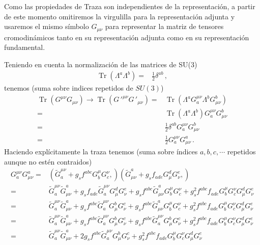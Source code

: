 Como las propiedades de Traza  son independientes de la representación, a partir de este momento omitiremos la virgulilla para la representación adjunta y usaremos el mismo símbolo $G_{\mu\nu}$ para representar la matriz de tensores cromodinámicos tanto en su representación adjunta como en su representación fundamental. 
\begin{frame}
Teniendo en cuenta la normalización de las matrices de SU(3)
\begin{align}
   \operatorname{Tr}\left(\Lambda^a\Lambda^b\right)=&\frac{1}{2}\delta^{ab}\,,
\end{align}
tenemos (suma sobre indices repetidos de $SU(3)$)
\begin{align}
  \operatorname{Tr}\left(G^{\mu\nu}G_{\mu\nu}\right)\to
  \operatorname{Tr}\left({G\,'}^{\mu\nu}{G\,'}_{\mu\nu}\right)
  =&\operatorname{Tr}\left(\Lambda^a{G}^{\mu\nu}_a \Lambda^b{G}_{\mu\nu}^b\right)\nonumber\\
  =&\operatorname{Tr}\left(\Lambda^a \Lambda^b\right){G}^{\mu\nu}_a {G}_{\mu\nu}^b\nonumber\\
  =&\frac{1}{2}\delta^{a b}{G}^{\mu\nu}_a {G}_{\mu\nu}^b\nonumber\\
  =&\frac{1}{2}{G}^{\mu\nu}_a {G}_{\mu\nu}^a\,.
\end{align}
Haciendo explícitamente la traza tenemos (suma sobre índices $a,b,c,\cdots$ repetidos aunque no estén contraidos)
\begin{align}
  {G}^{\mu\nu}_a {G}_{\mu\nu}^a=&
\left( \widetilde{G}^{\mu\nu}_a+g_s f^{abc}G^\mu_b G^\nu_c, \right)
\left( \widetilde{G}_{\mu\nu}^a+g_s f_{ade}G_\mu^d G_\nu^e, \right) \nonumber\\
=&\widetilde{G}^{\mu\nu}_a\widetilde{G}_{\mu\nu}^a+g_s f_{ade}\widetilde{G}^{\mu\nu}_aG_\mu^d G_\nu^e
+g_s f^{abc}\widetilde{G}_{\mu\nu}^a G^\mu_b G^\nu_c +g_s^2 f^{abc}f_{ade}G^\mu_b G^\nu_c G_\mu^d G_\nu^e 
\nonumber\\
=&\widetilde{G}^{\mu\nu}_a\widetilde{G}_{\mu\nu}^a+g_s f^{abc}\widetilde{G}^{\mu\nu}_aG_\mu^b G_\nu^c
+g_s f^{abc}\widetilde{G}_{\mu\nu}^a G^\mu_b G^\nu_c +g_s^2 f^{abc}f_{ade}G^\mu_b G^\nu_c G_\mu^d G_\nu^e 
\nonumber\\
=&\widetilde{G}^{\mu\nu}_a\widetilde{G}_{\mu\nu}^a+g_s f^{abc}\widetilde{G}^{\mu\nu}_aG_\mu^b G_\nu^c
+g_s f^{abc}\widetilde{G}^{\mu\nu}_aG_\mu^b G_\nu^c +g_s^2 f^{abc}f_{ade}G^\mu_b G^\nu_c G_\mu^d G_\nu^e 
\nonumber\\
=&\widetilde{G}^{\mu\nu}_a\widetilde{G}_{\mu\nu}^a+2g_s f^{abc}\widetilde{G}^{\mu\nu}_aG_\mu^b G_\nu^c
+g_s^2 f^{abc}f_{ade}G^\mu_b G^\nu_c G_\mu^d G_\nu^e 
\end{align}

\end{frame}
